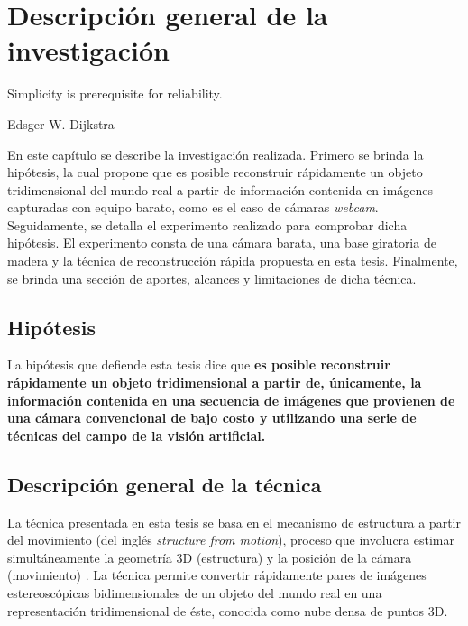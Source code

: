 \chapter{Descripci\'{o}n general de la investigaci\'{o}n}
\label{chap:descripcion}
\epigraph{Simplicity is prerequisite for reliability.}{Edsger W. Dijkstra}

En este cap\'{i}tulo se describe la investigaci\'{o}n realizada. Primero se brinda la hip\'{o}tesis, la cual propone que es posible reconstruir r\'{a}pidamente un objeto tridimensional del mundo real a partir de informaci\'{o}n contenida en im\'{a}genes capturadas con equipo barato, como es el caso de c\'{a}maras \textit{webcam}. Seguidamente, se detalla el experimento realizado para comprobar dicha hip\'{o}tesis. El experimento consta de una c\'{a}mara barata, una base giratoria de madera y la t\'{e}cnica de reconstrucci\'{o}n r\'{a}pida propuesta en esta tesis. Finalmente, se brinda una secci\'{o}n de aportes, alcances y limitaciones de dicha t\'{e}cnica.


\section{Hip\'{o}tesis}
La hip\'{o}tesis que defiende esta tesis dice que \textbf{es posible reconstruir r\'{a}pidamente un objeto tridimensional a partir de, \'{u}nicamente, la informaci\'{o}n contenida en una secuencia de im\'{a}genes que provienen de una c\'{a}mara convencional de bajo costo y utilizando una serie de t\'{e}cnicas del campo de la visi\'{o}n artificial.}


\section{Descripci\'{o}n general de la t\'{e}cnica}
La t\'{e}cnica presentada en esta tesis se basa en el mecanismo de estructura a partir del movimiento (del ingl\'{e}s \textit{structure from motion}), proceso que involucra estimar simult\'{a}neamente la geometr\'{i}a 3D (estructura) y la posici\'{o}n de la c\'{a}mara (movimiento) \cite{Ullman_1979,Szeliski_2010,Hartley_Zisserman_2003}. La t\'{e}cnica permite convertir r\'{a}pidamente pares de im\'{a}genes estereosc\'{o}picas bidimensionales de un objeto del mundo real en una representaci\'{o}n tridimensional de \'{e}ste, conocida como nube densa de puntos 3D.

